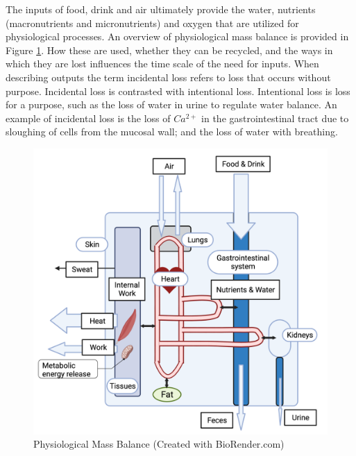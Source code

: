 The inputs of food, drink and air ultimately provide the water, nutrients (macronutrients and micronutrients) and oxygen that are utilized for physiological processes. An overview of physiological mass balance is provided in Figure \ref{fig:mass_balance}. How these are used, whether they can be recycled, and the ways in which they are lost influences the time scale of the need for inputs. When describing outputs the term incidental loss refers to loss that occurs without purpose. Incidental loss is contrasted with intentional loss. Intentional loss is loss for a purpose, such as the loss of water in urine to regulate water balance. An example of incidental loss is the loss of $Ca^{2+}$ in the gastrointestinal tract due to sloughing of cells from the mucosal wall; and the loss of water with breathing.\footnotemark{}



\begin{figure}[!h]
    \centering
    \includegraphics[width=1\linewidth]{./figure/mass_balance.png}
    \caption{Physiological Mass Balance \footnotesize{(Created with BioRender.com)}}
    \label{fig:mass_balance}
\end{figure}

